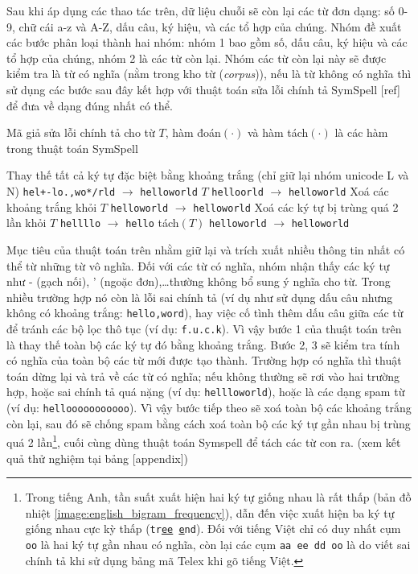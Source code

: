 Sau khi áp dụng các thao tác trên, dữ liệu chuỗi sẽ còn lại các từ đơn dạng: số 0-9, chữ cái a-z và A-Z, dấu câu, ký hiệu, và các tổ hợp của chúng. Nhóm đề xuất các bước phân loại thành hai nhóm: nhóm 1 bao gồm số, dấu câu, ký hiệu và các tổ hợp của chúng, nhóm 2 là các từ còn lại. Nhóm các từ còn lại này sẽ được kiểm tra là từ có nghĩa (nằm trong kho từ (\textit{corpus})), nếu là từ không có nghĩa thì sử dụng các bước sau đây kết hợp với thuật toán sửa lỗi chính tả SymSpell [ref] để đưa về dạng đúng nhất có thể.

\begin{algorithmz}[htb]
    \caption{Mã giả sửa lỗi chính tả cho từ $T$, hàm đoán$(\cdot)$ và hàm tách$(\cdot)$ là các hàm trong thuật toán SymSpell}
    \begin{algorithmic}[1]
        \State Thay thế tất cả ký tự đặc biệt bằng khoảng trắng (chỉ giữ lại nhóm unicode L và N)
        \Comment \texttt{hel+-lo.,wo*/rld} $\to$ \texttt{hel\textvisiblespace lo\textvisiblespace wo\textvisiblespace rld}
        \Return $T$
        \EndIf
        \Comment \texttt{hello\textvisiblespace orld} $\to$ \texttt{hello\textvisiblespace world}
        \State Xoá các khoảng trắng khỏi $T$
        \Comment \texttt{hello\textvisiblespace world} $\to$ \texttt{helloworld}
        \State Xoá các ký tự bị trùng quá 2 lần khỏi $T$
        \Comment \texttt{hellllo} $\to$ \texttt{hello}
        \State \Return tách$(T)$
        \Comment \texttt{helloworld} $\to$ \texttt{hello\textvisiblespace world}
    \end{algorithmic}
\end{algorithmz}

Mục tiêu của thuật toán trên nhằm giữ lại và trích xuất nhiều thông tin nhất có thể từ những từ vô nghĩa. Đối với các từ có nghĩa, nhóm nhận thấy các ký tự như - (gạch nối), ' (ngoặc đơn),\dots thường không bổ sung ý nghĩa cho từ. Trong nhiều trường hợp nó còn là lỗi sai chính tả (ví dụ như sử dụng dấu câu nhưng không có khoảng trắng: \texttt{hello,word}), hay việc cố tình thêm dấu câu giữa các từ để tránh các bộ lọc thô tục (ví dụ: \texttt{f.u.c.k}). Vì vậy bước 1 của thuật toán trên là thay thế toàn bộ các ký tự đó bằng khoảng trắng. Bước 2, 3 sẽ kiểm tra tính có nghĩa của toàn bộ các từ mới được tạo thành. Trường hợp có nghĩa thì thuật toán dừng lại và trả về các từ có nghĩa; nếu không thường sẽ rơi vào hai trường hợp, hoặc sai chính tả quá nặng (ví dụ: \texttt{hel\textvisiblespace llowo\textvisiblespace rld}), hoặc là các dạng spam từ (ví dụ: \texttt{hellooooooooooo}). Vì vậy bước tiếp theo sẽ xoá toàn bộ các khoảng trắng còn lại, sau đó sẽ chống spam bằng cách xoá toàn bộ các ký tự gần nhau bị trùng quá 2 lần\footnote{Trong tiếng Anh, tần suất xuất hiện hai ký tự giống nhau là rất thấp (bản đồ nhiệt \ref{image:english_bigram_frequency}), dẫn đến việc xuất hiện ba ký tự giống nhau cực kỳ thấp (\texttt{tr\underline{ee} \underline{e}nd}). Đối với tiếng Việt chỉ có duy nhất cụm \texttt{oo} là hai ký tự gần nhau có nghĩa, còn lại các cụm \texttt{aa ee dd oo} là do viết sai chính tả khi sử dụng bảng mã Telex khi gõ tiếng Việt.}, cuối cùng dùng thuật toán Symspell để tách các từ con ra. (xem kết quả thử nghiệm tại bảng [appendix])

